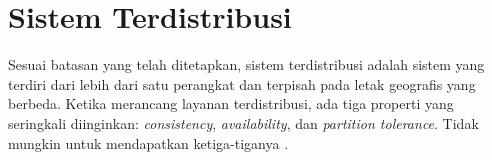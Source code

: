 \section{Sistem Terdistribusi}

Sesuai batasan yang telah ditetapkan, sistem terdistribusi adalah sistem yang terdiri dari lebih dari satu perangkat dan terpisah pada letak geografis yang berbeda. Ketika merancang layanan terdistribusi, ada tiga properti yang seringkali diinginkan: \textit{consistency}, \textit{availability}, dan \textit{partition tolerance}. Tidak mungkin untuk mendapatkan ketiga-tiganya \parencite{gilbert2002brewer}.



